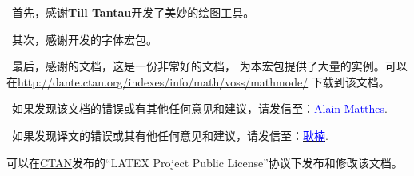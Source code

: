 \documentclass[DIV=14,
               fontsize=10,
               headinclude=false,
               index=totoc,
               footinclude=false,
               headings=small]{tkz-doc-zh}
\begin{document}
\presentation  

\vspace*{1cm}  
\lefthand\ 首先，感谢\textbf{Till Tantau}开发了美妙的\TIKZ{}绘图工具。

\vspace*{12pt}    
\lefthand\ 其次，感谢开发的字体宏包。

\vspace*{12pt}
\lefthand\ 最后，感谢的文档，这是一份非常好的文档，
为本宏包提供了大量的实例。可以在\url{http://dante.ctan.org/indexes/info/math/voss/mathmode/}
下载到该文档。


\vfill
\noindent\lefthand\ 如果发现该文档的错误或有其他任何意见和建议，请发信至：\href{mailto:al.ma@mac.com}{\textcolor{blue}{Alain Matthes}}.

\noindent\lefthand\ 如果发现译文的错误或其有他任何意见和建议，请发信至：\href{mailto:nangeng@nwafu.edu.cn}{\textcolor{blue}{耿楠}}.

可以在\href{http://www.ctan.org/}{CTAN}发布的``LATEX Project Public
License''协议下发布和修改该文档。
\end{document}
